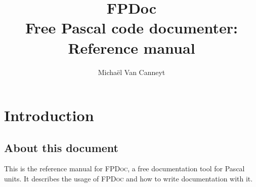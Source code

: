 %
%
%
%
%

%
%
\makeindex
%
%
\newcommand{\fpdoc}{\textsc{FPDoc}\xspace}
\newcommand{\seesu}[1]{section \ref{suse:#1}, page \pageref{suse:#1}\xspace}
\newcommand{\seetag}[1]{\tag{#1} (\pageref{tag:#1})\xspace}
\newcommand{\tag}[1]{\textbf{#1}}
\newcommand{\attr}[1]{\textit{#1}}
\usepackage{tabularx}
\usepackage{syntax}

\title{FPDoc\\Free Pascal code documenter: Reference manual}

\author{Micha\"el Van Canneyt}
\maketitle
\tableofcontents

\chapter{Introduction}

\section{About this document}
This is the reference manual for \fpdoc, a free documentation tool for 
Pascal units. It describes the usage of \fpdoc and how to write 
documentation with it. 

